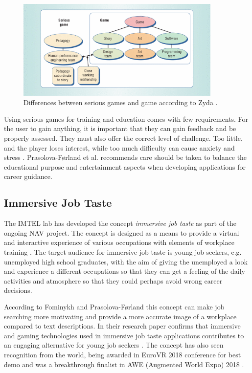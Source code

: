 \begin{figure}[!ht]
    \centering
    \includegraphics[width=0.9\textwidth]{./fig/background/seriousGames.png}
    \caption{Differences between serious games and game according to Zyda \cite{zyda2005visual}.}
    \label{fig:seriousGames}
\end{figure}

Using serious games for training and education comes with few requirements. For the user to gain anything, it is important that they can gain feedback and be properly assessed. They must also offer the correct level of challenge. Too little, and the player loses interest, while too much difficulty can cause anxiety and stress \cite{de2014serious}. Prasolova-Førland et al. \cite{prasolova2019empowering} recommends care should be taken to balance the educational purpose and entertainment aspects when developing applications for career guidance.

\subsection{Immersive Job Taste}
The IMTEL lab has developed the concept \textit{immersive job taste} as part of the ongoing NAV  project. The concept is designed as a means to provide a virtual and interactive experience of various occupations with elements of workplace training \cite{fominykh2019immersive}. The target audience for immersive job taste is  young job seekers, e.g. unemployed high school graduates, with the aim of giving the unemployed a look and experience a different occupations so that they can get a feeling of the daily activities and atmosphere so that they could perhaps avoid wrong career decisions. 

According to Fominykh and Prasolova-Førland \cite{fominykh2019immersive} this concept can make job searching more motivating and provide a more accurate image of a workplace compared to text descriptions. In their research paper confirms that immersive and gaming technologies used in immersive job taste applications contributes to an engaging alternative for young job seekers \cite{fominykh2019immersive}. The concept has also seen recognition from the world, being awarded in EuroVR 2018 conference for best demo and was a breakthrough finalist in AWE (Augmented World Expo) 2018 \cite{euroVR} \cite{aweAwards}.



